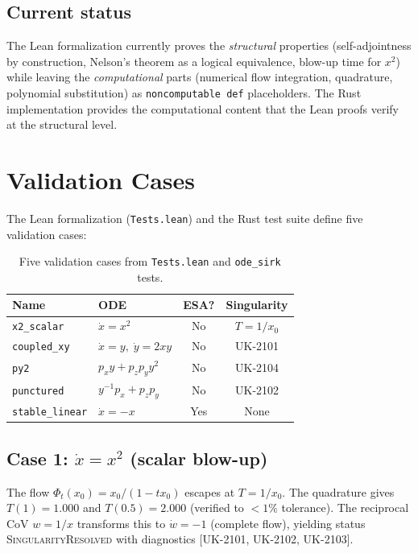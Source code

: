 \documentclass[11pt,a4paper]{article}
\begin{document}
\subsection{Current status}

The Lean formalization currently proves the \emph{structural} properties
(self-adjointness by construction, Nelson's theorem as a logical
equivalence, blow-up time for $x^{2}$) while leaving the
\emph{computational} parts (numerical flow integration, quadrature,
polynomial substitution) as \texttt{noncomputable def} placeholders.
The Rust implementation provides the computational content that the Lean
proofs verify at the structural level.

\section{Validation Cases}\label{sec:tests}

The Lean formalization (\texttt{Tests.lean}) and the Rust test suite
define five validation cases:

\begin{table}[h]
\centering
\begin{tabular}{@{}llcc@{}}
\toprule
\textbf{Name} & \textbf{ODE} & \textbf{ESA?} & \textbf{Singularity} \\
\midrule
\texttt{x2\_scalar} & $\dot{x}=x^{2}$ & No & $T=1/x_{0}$ \\
\texttt{coupled\_xy} & $\dot{x}=y,\;\dot{y}=2xy$ & No & UK-2101 \\
\texttt{py2} & $p_{x}y+p_{z}p_{y}y^{2}$ & No & UK-2104 \\
\texttt{punctured} & $y^{-1}p_{x}+p_{z}p_{y}$ & No & UK-2102 \\
\texttt{stable\_linear} & $\dot{x}=-x$ & Yes & None \\
\bottomrule
\end{tabular}
\caption{Five validation cases from \texttt{Tests.lean} and
\texttt{ode\_sirk} tests.}
\end{table}

\subsection{Case 1: $\dot{x}=x^{2}$ (scalar blow-up)}

The flow $\Phi_{t}(x_{0})=x_{0}/(1-tx_{0})$ escapes at $T=1/x_{0}$.
The quadrature gives $T(1)=1.000$ and $T(0.5)=2.000$ (verified to
$<1\%$ tolerance).  The reciprocal CoV $w=1/x$ transforms this to
$\dot{w}=-1$ (complete flow), yielding status
\textsc{SingularityResolved} with diagnostics [UK-2101, UK-2102,
UK-2103].
\end{document}

